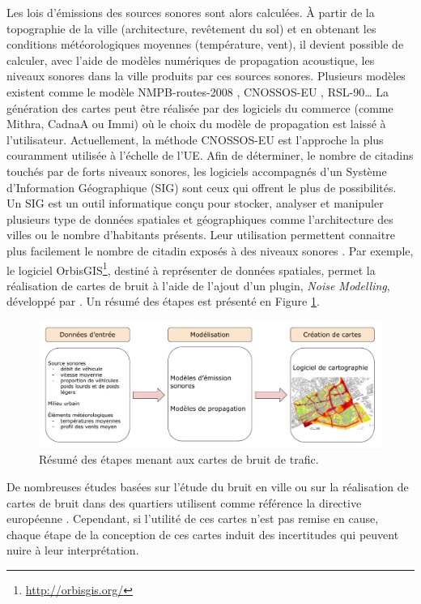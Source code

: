 Les lois d'émissions des sources sonores sont alors calculées. À partir de la topographie de la ville (architecture, revêtement du sol) et en obtenant les conditions météorologiques moyennes (température, vent), il devient possible de calculer, avec l'aide de modèles numériques de propagation acoustique, les niveaux sonores dans la ville produits par ces sources sonores. Plusieurs modèles existent comme le modèle NMPB-routes-2008 \cite{setra_prevision_2009-1, setra_prevision_2009-2},  CNOSSOS-EU \cite{CNOSSOS}, RSL-90\dots{} La génération des cartes peut être réalisée par des logiciels du commerce (comme Mithra, CadnaA ou Immi) où le choix du modèle de propagation est laissé à l'utilisateur. Actuellement, la méthode CNOSSOS-EU est l'approche la plus couramment utilisée à l'échelle de l'UE. Afin de déterminer, le nombre de citadins touchés par de forts niveaux sonores, les logiciels accompagnés d'un Système d'Information Géographique (SIG) sont ceux qui offrent le plus de possibilités. Un SIG est un outil informatique conçu pour stocker, analyser et manipuler plusieurs type de données spatiales et géographiques comme l'architecture des villes ou le nombre d'habitants présents. Leur utilisation permettent  connaitre plus facilement le nombre de citadin exposés à des niveaux sonores \cite{murphy2011scenario}. Par exemple, le logiciel OrbisGIS\footnote{\url{http://orbisgis.org/}}, destiné à représenter de données spatiales, permet la réalisation de cartes de bruit à l'aide de l'ajout d'un plugin, \textit{Noise Modelling}, développé par \cite{fortin:hal-00845701}. Un résumé des étapes est présenté en Figure \ref{fig:cartographie}.\\

\begin{figure}[t]
\centering
\includegraphics[width=.85\linewidth]{./figures/cartographie/cartographie.pdf}
\caption{Résumé des étapes menant aux cartes de bruit de trafic.}
\label{fig:cartographie}
\end{figure}


De nombreuses études basées sur l'étude du bruit en ville ou sur la réalisation de cartes de bruit dans des quartiers utilisent comme référence la directive européenne \cite{murphy_environmental_2006, murphy_estimating_2009, Eriksson_residential_2013}. Cependant, si l'utilité de ces cartes n'est pas remise en cause, chaque étape de la conception de ces cartes induit des incertitudes qui peuvent nuire à leur interprétation. 

